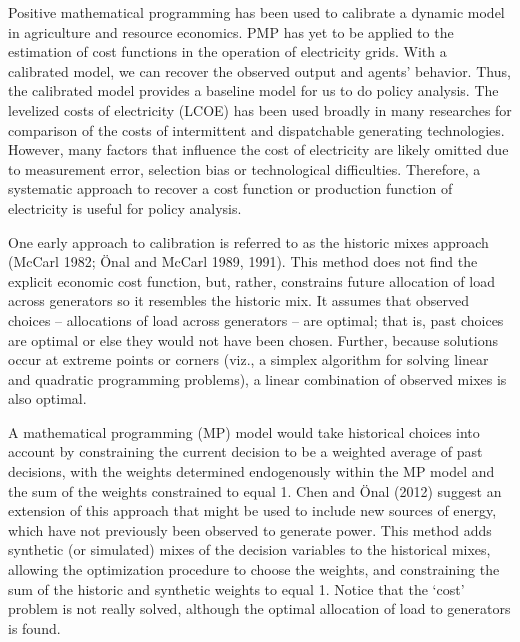 \documentclass[10pt,letter]{article}
\begin{document}
Positive mathematical programming has been used to calibrate a dynamic
model in agriculture and resource economics. PMP has yet to be applied
to the estimation of cost functions in the operation of electricity
grids. With a calibrated model, we can recover the observed output and
agents' behavior. Thus, the calibrated model provides a baseline model
for us to do policy analysis. The levelized costs of electricity (LCOE)
has been used broadly in many researches for comparison of the costs of
intermittent and dispatchable generating technologies. However, many
factors that influence the cost of electricity are likely omitted due to
measurement error, selection bias or technological difficulties.
Therefore, a systematic approach to recover a cost function or
production function of electricity is useful for policy analysis.

One early approach to calibration is referred to as the historic mixes
approach (McCarl 1982; Önal and McCarl 1989, 1991). This method does not
find the explicit economic cost function, but, rather, constrains future
allocation of load across generators so it resembles the historic mix.
It assumes that observed choices -- allocations of load across
generators -- are optimal; that is, past choices are optimal or else
they would not have been chosen. Further, because solutions occur at
extreme points or corners (viz., a simplex algorithm for solving linear
and quadratic programming problems), a linear combination of observed
mixes is also optimal.

A mathematical programming (MP) model would take historical choices into
account by constraining the current decision to be a weighted average of
past decisions, with the weights determined endogenously within the MP
model and the sum of the weights constrained to equal 1. Chen and Önal
(2012) suggest an extension of this approach that might be used to
include new sources of energy, which have not previously been observed
to generate power. This method adds synthetic (or simulated) mixes of
the decision variables to the historical mixes, allowing the
optimization procedure to choose the weights, and constraining the sum
of the historic and synthetic weights to equal 1. Notice that the `cost'
problem is not really solved, although the optimal allocation of load to
generators is found.
\end{document}
